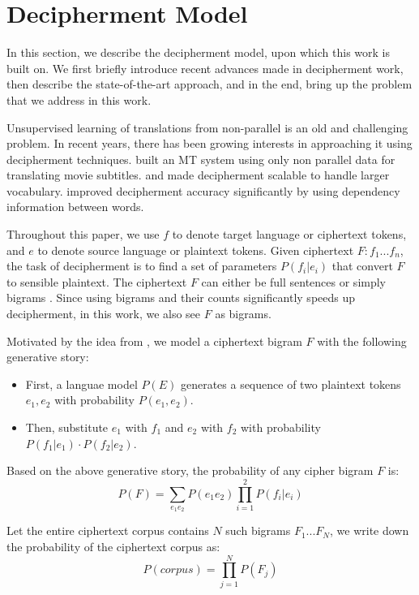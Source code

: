 \section{Decipherment Model}
In this section, we describe the decipherment model, upon which this work is built on. We first briefly introduce recent advances made in decipherment work, then describe the state-of-the-art approach, and in the end, bring up the problem that we address in this work. 

Unsupervised learning of translations from non-parallel is an old and challenging problem. In recent years, there has been growing interests in approaching it using decipherment techniques.  built an MT system using only non parallel data for translating movie subtitles.  and  made decipherment scalable to handle larger vocabulary.  improved decipherment accuracy significantly by using dependency information between words. 

Throughout this paper, we use $f$ to denote target language or ciphertext tokens, and $e$ to denote source language or plaintext tokens. Given ciphertext $F:f_{1}...f_{n}$, the task of decipherment is to find a set of parameters $P(f_{i}|e_{i})$ that convert $F$ to sensible plaintext. The ciphertext $F$ can either be full sentences \cite{ravi-knight:2011,Nuhn:2012} or simply bigrams \cite{dou-knight:2013:EMNLP}. Since using bigrams and their counts significantly speeds up decipherment, in this work, we also see $F$ as bigrams. 

Motivated by the idea from , we model a ciphertext bigram $F$ with the following generative story:

\begin{itemize}
\item  First, a languae model $P(E)$ generates a sequence of two plaintext tokens $e_{1},e_{2}$ with probability $P(e_{1},e_{2})$.
\item  Then, substitute $e_{1}$ with $f_{1}$ and $e_{2}$ with $f_{2}$ with probability $P(f_{1}|e_{1}) \cdot P(f_{2}|e_{2})$.
\end{itemize}

Based on the above generative story, the probability of any cipher bigram $F$ is:
%
\[
\label{p_cipher}
P(F) =  \sum_{e_{1}e_{2}} P(e_{1}e_{2}) \prod_{i=1}^{2}P(f_{i}|e_{i})
\]
%

Let the entire ciphertext corpus contains $N$ such bigrams $F_{1}...F_{N}$, we write down the probability of the ciphertext corpus as:
%
\[
\label{p_corpus}
P(corpus) =  \prod_{j=1}^{N} P(F_{j})
\]
%


